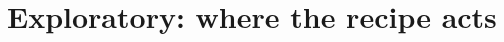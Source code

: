\documentclass{article}
\begin{document}
\section{Exploratory: where the recipe acts}
\label{sec:mechanism}
\end{document}
